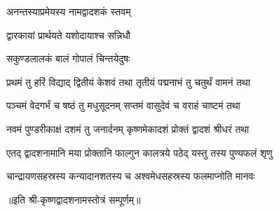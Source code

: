 
{अनन्तस्याप्रमेयस्य नामद्वादशकं स्तवम्}

{द्वारकायां प्रार्थयते यशोदायाश्च सन्निधौ}

{सकुण्डलालकं बालं गोपालं चिन्तयेदुषः}

\twolineshloka
{प्रथमं तु हरिं विद्याद् द्वितीयं केशवं तथा}
{तृतीयं पद्मनाभं तु चतुर्थं वामनं तथा}%

\twolineshloka
{पञ्चमं वेदगर्भं च षष्ठं तु मधुसूदनम्}
{सप्तमं वासुदेवं च वराहं चाष्टमं तथा}%

\twolineshloka
{नवमं पुण्डरीकाक्षं दशमं तु जनार्दनम्}
{कृष्णमेकादशं प्रोक्तं द्वादशं श्रीधरं तथा}%

\twolineshloka
{एतद् द्वादशनामानि मया प्रोक्तानि फाल्गुन}
{कालत्रये पठेद् यस्तु तस्य पुण्यफलं शृणु}%

\twolineshloka
{चान्द्रायणसहस्रस्य कन्यादानशतस्य च}
{अश्वमेधसहस्रस्य फलमाप्नोति मानवः}%

॥इति श्री-कृष्णद्वादशनामस्तोत्रं सम्पूर्णम्‌॥